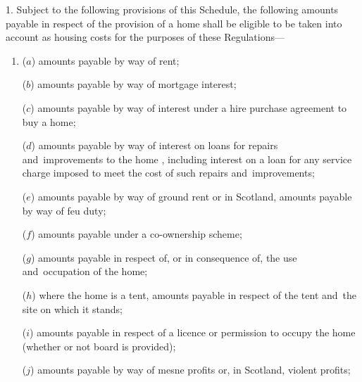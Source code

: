 \documentclass[12pt,a4paper]{article}
\begin{document}
1.  Subject to the following provisions of this Schedule, 
the following amounts payable  %
in respect of the provision of a home shall be eligible to be taken into account as housing costs for the purposes of these Regulations—
\begin{enumerate}\item[]
($a$) 
amounts payable by way of  %
rent;


($b$) amounts payable by way of mortgage interest;

($c$) 
amounts payable by way of interest  %
under a hire purchase agreement to buy a home;

($d$) 
amounts payable by way of interest  %
on loans for repairs and~improvements to the home%
, including interest on a loan for any service charge imposed to meet the cost of such repairs and~improvements; %

($e$) 
amounts payable  %
by way of ground rent or in Scotland, 
amounts payable  %
by way of feu duty;

($f$) 
amounts payable  %
under a co-ownership scheme;

($g$) 
amounts payable  %
in respect of, or in consequence of, the use and~occupation of the home;

($h$) where the home is a tent, 
amounts payable  %
in respect of the tent and~the site on which it stands;

($i$) 
amounts payable  %
in respect of a licence or permission to occupy the home (whether or not board is provided);

($j$) 
amounts payable  %
by way of mesne profits or, in Scotland, violent profits;%


\end{enumerate}
\end{document}
